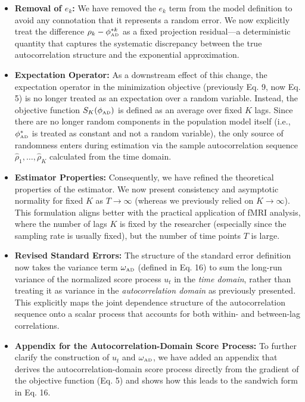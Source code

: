 \documentclass[docs/main.tex]{subfiles}
\begin{document}
\begin{itemize}
    \item \textbf{Removal of $e_k$:} We have removed the $e_k$ term from the model definition to avoid any connotation that it represents a random error. We now explicitly treat the difference $\rho_k - \phi_{\scriptscriptstyle\text{AD}}^{*k}$ as a fixed projection residual---a deterministic quantity that captures the systematic discrepancy between the true autocorrelation structure and the exponential approximation.
    
    \item \textbf{Expectation Operator:} As a downstream effect of this change, the expectation operator in the minimization objective (previously Eq. 9, now Eq. 5) is no longer treated as an expectation over a random variable. Instead, the objective function $S_K(\phi_{\scriptscriptstyle\text{AD}})$ is defined as an average over fixed $K$ lags. Since there are no longer random components in the population model itself (i.e., $\phi_{\scriptscriptstyle\text{AD}}^*$ is treated as constant and not a random variable), the only source of randomness enters during estimation via the sample autocorrelation sequence $\hat{\rho}_1, \dots, \hat{\rho}_K$ calculated from the time domain.

    \item \textbf{Estimator Properties:} Consequently, we have refined the theoretical properties of the estimator. We now present consistency and asymptotic normality for fixed $K$ as $T \to \infty$ (whereas we previously relied on $K \to \infty$). This formulation aligns better with the practical application of fMRI analysis, where the number of lags $K$ is fixed by the researcher (especially since the sampling rate is usually fixed), but the number of time points $T$ is large.
    
    \item \textbf{Revised Standard Errors:} The structure of the standard error definition now takes the variance term $\omega_{\scriptscriptstyle\text{AD}}$ (defined in Eq. 16) to sum the long-run variance of the normalized score process $u_t$ in the \textit{time domain}, rather than treating it as variance in the \textit{autocorrelation domain} as previously presented. This explicitly maps the joint dependence structure of the autocorrelation sequence onto a scalar process that accounts for both within- and between-lag correlations. 

    \item \textbf{Appendix for the Autocorrelation-Domain Score Process:} To further clarify the construction of $u_t$ and $\omega_{\scriptscriptstyle\text{AD}}$, we have added an appendix that derives the autocorrelation-domain score process directly from the gradient of the objective function (Eq. 5) and shows how this leads to the sandwich form in Eq. 16.
\end{itemize}
\end{document}
